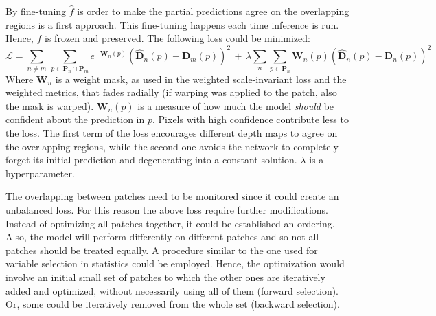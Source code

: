 By fine-tuning $\hat{f}$ is order to make the partial predictions agree on the overlapping regions is a first approach.
This fine-tuning happens each time inference is run.
Hence, $f$ is frozen and preserved.
The following loss could be minimized:
\[
    \mathcal{L} =
        \sum_{n \neq m} \,
        \sum_{p \in \mathbf{P}_{n} \cap \mathbf{P}_{m}}
        e^{-\mathbf{W}_{n}(p)}
        (\hat{\mathbf{D}}_{n}(p) - \mathbf{D}_{m}(p))^{2}
        \, + \,
        \lambda
        \sum_{n}
        \sum_{p \in \mathbf{P}_{n}}
        \mathbf{W}_{n}(p)
        (\hat{\mathbf{D}}_{n}(p) - \mathbf{D}_{n}(p))^{2}
\]
Where $\mathbf{W}_{n}$ is a weight mask, as used in the weighted scale-invariant loss and the weighted metrics, that fades radially (if warping was applied to the patch, also the mask is warped).
$\mathbf{W}_{n}(p)$ is a measure of how much the model \textit{should} be confident about the prediction in $p$.
Pixels with high confidence contribute less to the loss.
The first term of the loss encourages different depth maps to agree on the overlapping regions, while the second one avoids the network to completely forget its initial prediction and degenerating into a constant solution. 
$\lambda$ is a hyperparameter.

The overlapping between patches need to be monitored since it could create an unbalanced loss.
For this reason the above loss require further modifications.
Instead of optimizing all patches together, it could be established an ordering.
Also, the model will perform differently on different patches and so not all patches should be treated equally.
A procedure similar to the one used for variable selection in statistics could be employed.
Hence, the optimization would involve an initial small set of patches to which the other ones are iteratively added and optimized, without necessarily using all of them (forward selection).
Or, some could be iteratively removed from the whole set (backward selection).

